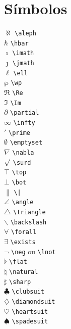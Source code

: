 \documentclass{fei}
\begin{document}
\section{Símbolos}
\begin{multicols}{3}
\noindent
\(\aleph\) \verb+\aleph+\\
\(\hbar\) \verb+\hbar+\\
\(\imath\) \verb+\imath+\\
\(\jmath\) \verb+\jmath+\\
\(\ell\) \verb+\ell+\\
\(\wp\) \verb+\wp+\\
\(\Re\) \verb+\Re+\\
\(\Im\) \verb+\Im+\\
\(\partial\) \verb+\partial+\\
\(\infty\) \verb+\infty+\\
\(\prime\) \verb+\prime+\\
\(\emptyset\) \verb+\emptyset+\\
\(\nabla\) \verb+\nabla+\\
\(\surd\) \verb+\surd+\\
\(\top\) \verb+\top+\\
\(\bot\) \verb+\bot+\\
\(\|\) \verb+\|+\\
\(\angle\) \verb+\angle+\\
\(\triangle\) \verb+\triangle+\\
\(\backslash\) \verb+\backslash+\\
\(\forall\) \verb+\forall+\\
\(\exists\) \verb+\exists+\\
\(\lnot\) \verb+\neg+ ou \verb+\lnot+\\
\(\flat\) \verb+\flat+\\
\(\natural\) \verb+\natural+\\
\(\sharp\) \verb+\sharp+\\
\(\clubsuit\) \verb+\clubsuit+\\
\(\diamondsuit\) \verb+\diamondsuit+\\
\(\heartsuit\) \verb+\heartsuit+\\
\(\spadesuit\) \verb+\spadesuit+\\
\end{multicols}
\end{document}
